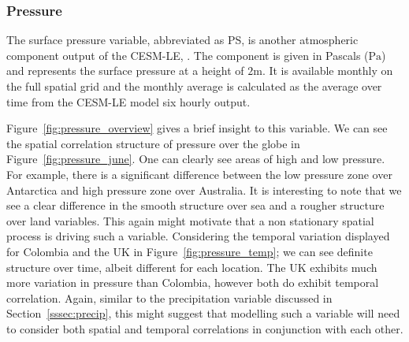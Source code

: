 \subsubsection{Pressure \label{sssec:pressure}}
The surface pressure variable, abbreviated as PS, is another atmospheric component output of the CESM-LE, \citep{kay_community_2015}.
The component is given in Pascals ($\si{\pascal}$) and represents the surface pressure at a height of $2\si{\meter}$. It is available monthly on the full spatial grid and the monthly average is calculated as the average over time from the CESM-LE model six hourly output.

Figure~\ref{fig:pressure_overview} gives a brief insight to this variable. 
We can see the spatial correlation structure of pressure over the globe in Figure~\ref{fig:pressure_june}.
One can clearly see areas of high and low pressure.
For example, there is a significant difference between the low pressure zone over Antarctica and high pressure zone over Australia. 
It is interesting to note that we see a clear difference in the smooth structure over sea and a rougher structure over land variables. 
This again might motivate that a non stationary spatial process is driving such a variable.
Considering the temporal variation displayed for Colombia and the UK in Figure~\ref{fig:pressure_temp}; we can see definite structure over time, albeit different for each location.
The UK exhibits much more variation in pressure than Colombia, however both do exhibit temporal correlation. 
Again, similar to the precipitation variable discussed in Section~\ref{sssec:precip}, this might suggest that modelling such a variable will need to consider both spatial and temporal correlations in conjunction with each other.


